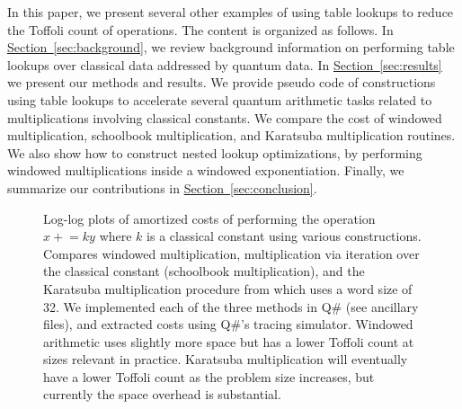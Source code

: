 \documentclass[onecolumn,unpublished]{quantumarticle}
\theoremstyle{definition}
\theoremstyle{definition}
\theoremstyle{definition}
\renewcommand{\sec}[1]{\hyperref[sec:#1]{Section~\ref*{sec:#1}}}
\newcommand{\pluseq}{\mathrel{+}=}
\begin{document}
In this paper, we present several other examples of using table lookups to reduce the Toffoli count of operations.
The content is organized as follows.
In \sec{background}, we review background information on performing table lookups over classical data addressed by quantum data.
In \sec{results} we present our methods and results.
We provide pseudo code of constructions using table lookups to accelerate several quantum arithmetic tasks related to multiplications involving classical constants.
We compare the cost of windowed multiplication, schoolbook multiplication, and Karatsuba multiplication routines.
We also show how to construct nested lookup optimizations, by performing windowed multiplications inside a windowed exponentiation.
Finally, we summarize our contributions in \sec{conclusion}.

\begin{figure}[h!]
    \centering
    \caption{
        \label{fig:product-add-costs}
        Log-log plots of amortized costs of performing the operation $x \pluseq ky$ where $k$ is a classical constant using various constructions.
        Compares windowed multiplication, multiplication via iteration over the classical constant (schoolbook multiplication), and the Karatsuba multiplication procedure from \cite{gidney2019karatsuba} which uses a word size of 32.
        We implemented each of the three methods in Q\# (see ancillary files), and extracted costs using Q\#'s tracing simulator.
        Windowed arithmetic uses slightly more space but has a lower Toffoli count at sizes relevant in practice.
        Karatsuba multiplication will eventually have a lower Toffoli count as the problem size increases, but currently the space overhead is substantial.
    }
\end{figure}
\end{document}
